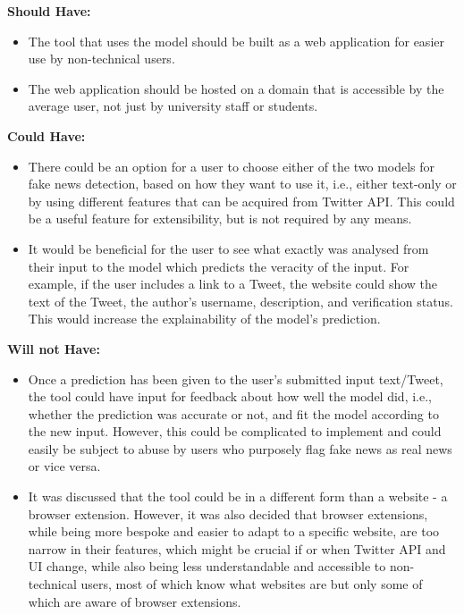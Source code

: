 \documentclass{l4proj}
\begin{document}
\textbf{Should Have:}
\begin{itemize}
    \item The tool that uses the model should be built as a web application for easier use by non-technical users.
    \item The web application should be hosted on a domain that is accessible by the average user, not just by university staff or students.
\end{itemize}

\textbf{Could Have:}
\begin{itemize}
    \item There could be an option for a user to choose either of the two models for fake news detection, based on how they want to use it, i.e., either text-only or by using different features that can be acquired from Twitter API. This could be a useful feature for extensibility, but is not required by any means.
    \item It would be beneficial for the user to see what exactly was analysed from their input to the model which predicts the veracity of the input. For example, if the user includes a link to a Tweet, the website could show the text of the Tweet, the author's username, description, and verification status. This would increase the explainability of the model's prediction.
\end{itemize}

\textbf{Will not Have:}
\begin{itemize}
    \item Once a prediction has been given to the user's submitted input text/Tweet, the tool could have input for feedback about how well the model did, i.e., whether the prediction was accurate or not, and fit the model according to the new input. However, this could be complicated to implement and could easily be subject to abuse by users who purposely flag fake news as real news or vice versa. 
    \item It was discussed that the tool could be in a different form than a website - a browser extension. However, it was also decided that browser extensions, while being more bespoke and easier to adapt to a specific website, are too narrow in their features, which might be crucial if or when Twitter API and UI change, while also being less understandable and accessible to non-technical users, most of which know what websites are but only some of which are aware of browser extensions.
\end{itemize}
\end{document}
